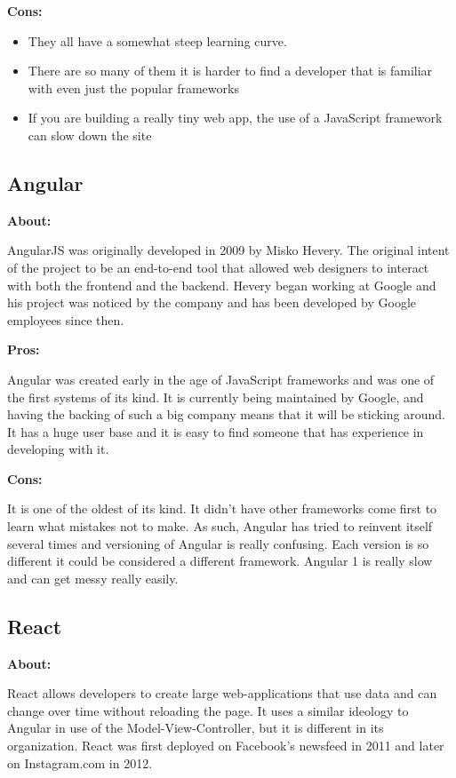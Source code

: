 \documentclass[draftclsnofoot,onecolumn,letterpaper,10pt,compsoc]{IEEEtran}
\begin{document}
    \noindent \textbf{Cons:}
    \begin{itemize}
      \item They all have a somewhat steep learning curve.
      \item There are so many of them it is harder to find a developer that is familiar with even just the popular frameworks
      \item If you are building a really tiny web app, the use of a JavaScript framework  can slow down the site
    \end{itemize}

	\subsection{Angular}

    \textbf{About:}

    AngularJS was originally developed in 2009 by Misko Hevery\cite{AngularIntroduction}.
    The original intent of the project to be an end-to-end tool that allowed web designers to interact with both the frontend and the backend.\cite{HistoryOfAngular}
    Hevery began working at Google and his project was noticed by the company and has been developed by Google employees since then.

    \noindent \textbf{Pros:}

    Angular was created early in the age of JavaScript frameworks and was one of the first systems of its kind.
    It is currently being maintained by Google, and having the backing of such a big company means that it will be sticking around.
    It has a huge user base and it is easy to find someone that has experience in developing with it.

    \noindent \textbf{Cons:}

    It is one of the oldest of its kind.
    It didn't have other frameworks come first to learn what mistakes not to make.
    As such, Angular has tried to reinvent itself several times and versioning of Angular is really confusing. Each version is so different it could be considered a different framework.
    Angular 1 is really slow\cite{SpeedReport} and can get messy really easily.


	\subsection{React}
    \textbf{About:}

    React allows developers to create large web-applications that use data and can change over time without reloading the page.
    It uses a similar ideology to Angular in use of the Model-View-Controller, but it is different in its organization.
    React was first deployed on Facebook's newsfeed in 2011 and later on Instagram.com in 2012.
\end{document}
